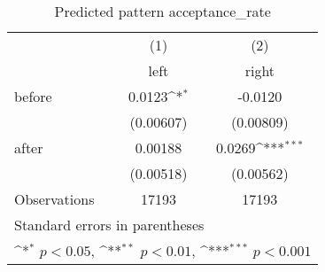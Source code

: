 \begin{table}[htbp]\centering
\def\sym#1{\ifmmode^{#1}\else\(^{#1}\)\fi}
\caption{Predicted pattern acceptance\_rate}
\begin{tabular}{l*{2}{c}}
\hline\hline
                    &\multicolumn{1}{c}{(1)}&\multicolumn{1}{c}{(2)}\\
                    &\multicolumn{1}{c}{left}&\multicolumn{1}{c}{right}\\
\hline
before              &      0.0123\sym{*}  &     -0.0120         \\
                    &   (0.00607)         &   (0.00809)         \\
[1em]
after               &     0.00188         &      0.0269\sym{***}\\
                    &   (0.00518)         &   (0.00562)         \\
\hline
Observations        &       17193         &       17193         \\
\hline\hline
\multicolumn{3}{l}{\footnotesize Standard errors in parentheses}\\
\multicolumn{3}{l}{\footnotesize \sym{*} \(p<0.05\), \sym{**} \(p<0.01\), \sym{***} \(p<0.001\)}\\
\end{tabular}
\end{table}
